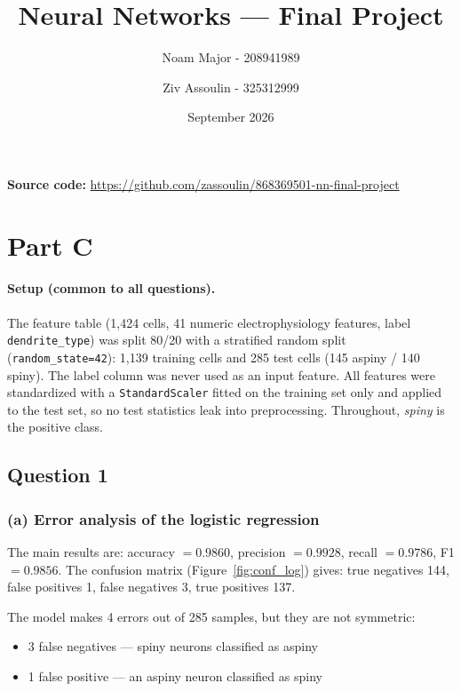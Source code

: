 \documentclass[11pt]{article}
\title{Neural Networks --- Final Project}
\author{Noam Major - 208941989 \and Ziv Assoulin - 325312999}
\date{September 2026}
\begin{document}
\maketitle
\begin{center}
\small\textbf{Source code:} \url{https://github.com/zassoulin/868369501-nn-final-project}
\end{center}

\clearpage

\section{Part C}

\paragraph{Setup (common to all questions).}
The feature table (1{,}424 cells, 41 numeric electrophysiology features, label \texttt{dendrite\_type}) was split 80/20 with a stratified random split (\texttt{random\_state=42}): 1{,}139 training cells and 285 test cells (145 aspiny / 140 spiny). The label column was never used as an input feature. All features were standardized with a \texttt{StandardScaler} fitted on the training set only and applied to the test set, so no test statistics leak into preprocessing. Throughout, \emph{spiny} is the positive class.

\FloatBarrier
\subsection{Question 1}

\FloatBarrier
\subsubsection*{(a) Error analysis of the logistic regression}
The main results are: accuracy $=0.9860$, precision $=0.9928$, recall $=0.9786$, F1 $=0.9856$.
The confusion matrix (Figure~\ref{fig:conf_log}) gives: true negatives 144, false positives 1, false negatives 3, true positives 137.

The model makes 4 errors out of 285 samples, but they are not symmetric:
\begin{itemize}
    \item 3 false negatives --- spiny neurons classified as aspiny
    \item 1 false positive --- an aspiny neuron classified as spiny
\end{itemize}
\end{document}
